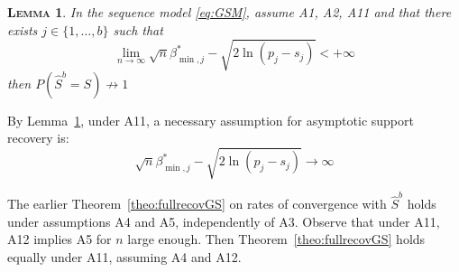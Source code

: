 \documentclass[aos]{imsart}
\theoremstyle{plain}
\newtheorem{lem}[thm]{\textsc{Lemma}}
\begin{document}
\begin{lem}\label{lem:necbetaminblockthresh2}
    In the sequence model \eqref{eq:GSM}, assume A1, A2, A11 and that there exists $j\in\{1,\ldots,b\}$ such that
\begin{equation}\label{eq:necbetaminblockthreshbis}
      \lim_{n\to \infty}\sqrt{n}\beta_{\min,j}^*-\sqrt{2\ln(p_j-s_j)} < +\infty  
    \end{equation}
then \;  $P(\hat{S}^{b} = S)\not \to 1$
\end{lem}
By Lemma~\ref{lem:necbetaminblockthresh2}, under A11, a necessary assumption for asymptotic support recovery is:
\begin{equation}\label{eq:nectypeIIGSMfinite}
    \sqrt{n}\beta_{\min,j}^*-\sqrt{2\ln(p_j-s_j)} \to \infty
\end{equation}

The earlier Theorem~\ref{theo:fullrecovGS} on rates of convergence with $\hat S^b$ holds under assumptions A4 and A5, independently of A3. Observe that under A11, A12 implies A5 for $n$ large enough. Then Theorem~\ref{theo:fullrecovGS} holds equally under A11, assuming A4 and A12.
\end{document}
